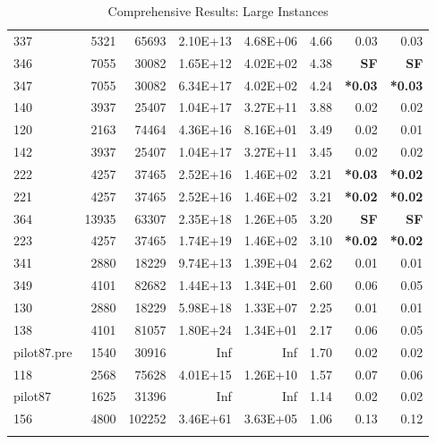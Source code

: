 \documentclass[10pt]{article}
\newcommand{\red}{
	\color{red}	
	}
\begin{document}
\begin{longtable}{|l|r|r|r|r|r|r|r|}
337	&	5321	&	65693	&	2.10E+13	&	4.68E+06	&	4.66	&	0.03	&	0.03	\\
346	&	7055	&	30082	&	1.65E+12	&	4.02E+02	&	4.38	&	{\bf \red SF}	&	{\bf \red SF}	\\
347	&	7055	&	30082	&	6.34E+17	&	4.02E+02	&	4.24	&	{\bf \red *0.03}	&	{\bf \red *0.03}	\\
140	&	3937	&	25407	&	1.04E+17	&	3.27E+11	&	3.88	&	0.02	&	0.02	\\
120	&	2163	&	74464	&	4.36E+16	&	8.16E+01	&	3.49	&	0.02	&	0.01	\\
142	&	3937	&	25407	&	1.04E+17	&	3.27E+11	&	3.45	&	0.02	&	0.02	\\
222	&	4257	&	37465	&	2.52E+16	&	1.46E+02	&	3.21	&	{\bf \red *0.03}	&	{\bf \red *0.02}	\\
221	&	4257	&	37465	&	2.52E+16	&	1.46E+02	&	3.21	&	{\bf \red *0.02}	&	{\bf \red *0.02}	\\
364	&	13935	&	63307	&	2.35E+18	&	1.26E+05	&	3.20	&	{\bf \red SF}	&	{\bf \red SF}	\\
223	&	4257	&	37465	&	1.74E+19	&	1.46E+02	&	3.10	&	{\bf \red *0.02}	&	{\bf \red *0.02}	\\
341	&	2880	&	18229	&	9.74E+13	&	1.39E+04	&	2.62	&	0.01	&	0.01	\\
349	&	4101	&	82682	&	1.44E+13	&	1.34E+01	&	2.60	&	0.06	&	0.05	\\
130	&	2880	&	18229	&	5.98E+18	&	1.33E+07	&	2.25	&	0.01	&	0.01	\\
138	&	4101	&	81057	&	1.80E+24	&	1.34E+01	&	2.17	&	0.06	&	0.05	\\
pilot87.pre	&	1540	&	30916	&	Inf	&	Inf	&	1.70	&	0.02	&	0.02	\\
118	&	2568	&	75628	&	4.01E+15	&	1.26E+10	&	1.57	&	0.07	&	0.06	\\
pilot87	&	1625	&	31396	&	Inf	&	Inf	&	1.14	&	0.02	&	0.02	\\
156	&	4800	&	102252	&	3.46E+61	&	3.63E+05	&	1.06	&	0.13	&	0.12	\\		
\hline
\caption{Comprehensive Results: Large Instances}
\small
\centering
\label{supptab:all_large}
\end{longtable}
\end{document}
